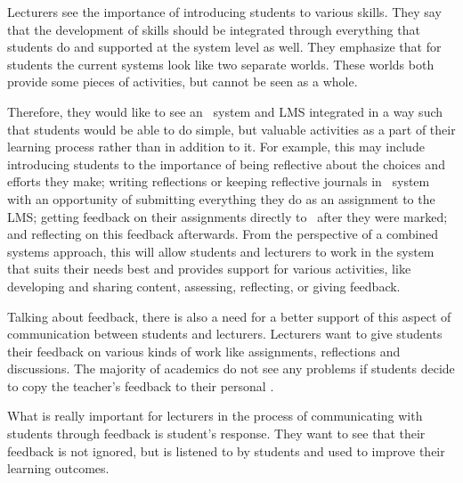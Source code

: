
Lecturers see the importance of introducing students to various \LLLs skills.
They say that the development of \LLLs skills should be integrated through
everything that students do and supported at the system level as well. They
emphasize that for students the current systems look like two separate worlds.
These worlds both provide some pieces of activities, but cannot be seen as a
whole.


Therefore, they would like to see an \ep~system and LMS integrated in a way
such that students would be able to do simple, but valuable activities as a part
of their learning process rather than in addition to it. For example, this may
include introducing students to the importance of being reflective about the
choices and efforts they make; writing reflections or keeping reflective
journals in \ep~system with an opportunity of submitting everything they do as
an assignment to the LMS; getting feedback on their assignments directly to
\ep~after they were marked; and reflecting on this feedback afterwards. From the
perspective of a combined systems approach, this will allow students and
lecturers to work in the system that suits their needs best and provides support
for various activities, like developing and sharing content, assessing,
reflecting, or giving feedback.

Talking about feedback, there is also a need for a better support of this aspect
of communication between students and lecturers. Lecturers want to give students
their feedback on various kinds of work like assignments, reflections and
discussions. The majority of academics do not see any problems if students
decide to copy the teacher's feedback to their personal \ep.


What is really important for lecturers in the process of communicating with
students through feedback is student's response. They want to see that their
feedback is not ignored, but is listened to by students and used to improve
their learning outcomes.

